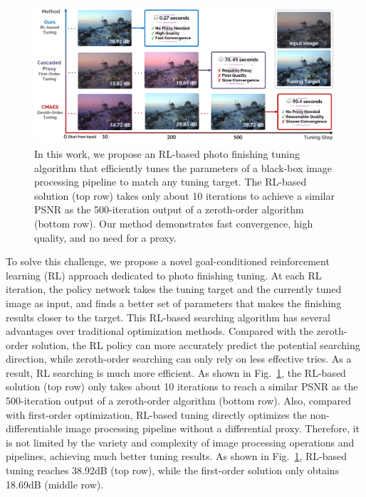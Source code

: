 \documentclass{article}
\newcommand{\pipeline}{image processing pipeline\xspace}
\newcommand{\tuning}{photo finishing tuning\xspace}
\begin{document}
\begin{figure}[t]
\centering
  \includegraphics[width=1\linewidth]{figures/teaser_v3.pdf}
  \caption{In this work, we propose an RL-based photo finishing tuning algorithm that efficiently tunes the parameters of a black-box \pipeline to match any tuning target. The RL-based solution (top row) takes only about 10 iterations to achieve a similar PSNR as the 500-iteration output of a zeroth-order algorithm (bottom row). Our method demonstrates fast convergence, high quality, and no need for a proxy.\vspace{-20pt}}
  \label{fig:teaser}
\end{figure}


To solve this challenge, we propose a novel goal-conditioned reinforcement learning (RL) approach dedicated to \tuning. At each RL iteration, the policy network takes the tuning target and the currently tuned image as input, and finds a better set of parameters that makes the finishing results closer to the target. This RL-based searching algorithm has several advantages over traditional optimization methods. Compared with the zeroth-order solution, the RL policy can more accurately predict the potential searching direction, while zeroth-order searching can only rely on less effective tries. As a result, RL searching is much more efficient. As shown in Fig.~\ref{fig:teaser}, the RL-based solution (top row) only takes about 10 iterations to reach a similar PSNR as the 500-iteration output of a zeroth-order algorithm (bottom row). Also, compared with first-order optimization, RL-based tuning directly optimizes the non-differentiable \pipeline without a differential proxy. Therefore, it is not limited by the variety and complexity of image processing operations and pipelines, achieving much better tuning results. As shown in Fig.~\ref{fig:teaser}, RL-based tuning reaches 38.92dB (top row), while the first-order solution only obtains 18.69dB (middle row).
\end{document}
